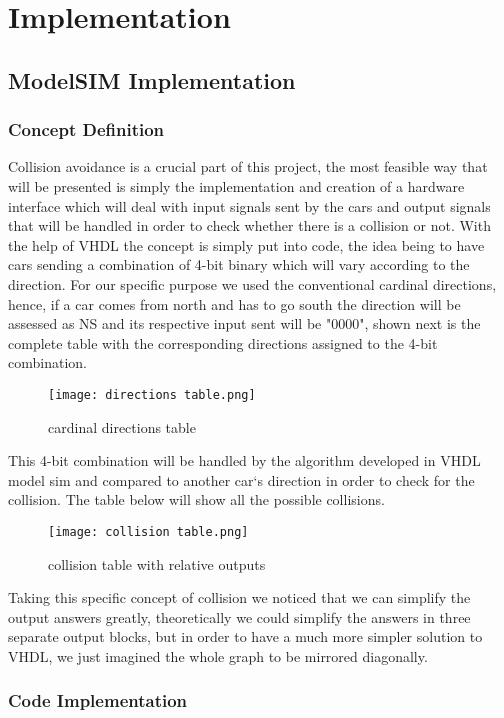 \documentclass[conference]{IEEEtran}
\begin{document}
\section{Implementation}
\subsection{ModelSIM Implementation}
\subsubsection{Concept Definition}
Collision avoidance is a crucial part of this project, the most feasible way that will be presented is simply the implementation and creation of a hardware interface which will deal with input signals sent by the cars and output signals that will be handled in order to check whether there is a collision or not. With the help of VHDL the concept is simply put into code, the idea being to have cars sending a combination of 4-bit binary which will vary according to the direction. For our specific purpose we used the conventional cardinal directions, hence, if a car comes from north and has to go south the direction will be assessed as NS and its respective input sent will be "0000", shown next is the complete table with the corresponding directions assigned to the 4-bit combination.

\begin{figure}[h]
    \centerline{\texttt{[image: directions table.png]}}
    \caption{cardinal directions table}
    \label{directions}
\end{figure}

This 4-bit combination will be handled by the algorithm developed in VHDL model sim and compared to another car`s direction in order to check for the collision. The table below will show all the possible collisions.

\begin{figure}[h]
    \centerline{\texttt{[image: collision table.png]}}
    \caption{collision table with relative outputs}
    \label{table}
\end{figure}

Taking this specific concept of collision we noticed that we can simplify the output answers greatly, theoretically we could simplify the answers in three separate output blocks, but in order to have a much more simpler solution to VHDL, we just imagined the whole graph to be mirrored diagonally.

\subsubsection{Code Implementation}
\end{document}
